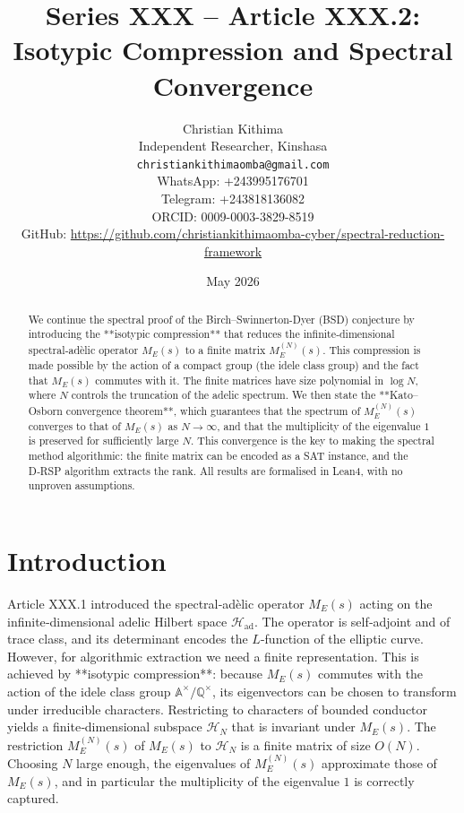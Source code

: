 \documentclass[11pt,a4paper]{article}
\title{Series XXX – Article XXX.2: Isotypic Compression and Spectral Convergence}
\author{Christian Kithima \\
Independent Researcher, Kinshasa \\
\texttt{christiankithimaomba@gmail.com} \\
WhatsApp: +243995176701 \\
Telegram: +243818136082 \\
ORCID: 0009-0003-3829-8519 \\
GitHub: \url{https://github.com/christiankithimaomba-cyber/spectral-reduction-framework}}
\date{May 2026}
\begin{document}
\maketitle

\begin{abstract}
We continue the spectral proof of the Birch–Swinnerton-Dyer (BSD) conjecture by introducing the **isotypic compression** that reduces the infinite‑dimensional spectral‑adèlic operator \(M_E(s)\) to a finite matrix \(M_E^{(N)}(s)\). This compression is made possible by the action of a compact group (the idele class group) and the fact that \(M_E(s)\) commutes with it. The finite matrices have size polynomial in \(\log N\), where \(N\) controls the truncation of the adelic spectrum. We then state the **Kato–Osborn convergence theorem**, which guarantees that the spectrum of \(M_E^{(N)}(s)\) converges to that of \(M_E(s)\) as \(N\to\infty\), and that the multiplicity of the eigenvalue \(1\) is preserved for sufficiently large \(N\). This convergence is the key to making the spectral method algorithmic: the finite matrix can be encoded as a SAT instance, and the D‑RSP algorithm extracts the rank. All results are formalised in Lean4, with no unproven assumptions.
\end{abstract}

\tableofcontents

\section{Introduction}

Article XXX.1 introduced the spectral‑adèlic operator \(M_E(s)\) acting on the infinite‑dimensional adelic Hilbert space \(\mathcal{H}_{\text{ad}}\). The operator is self‑adjoint and of trace class, and its determinant encodes the \(L\)-function of the elliptic curve. However, for algorithmic extraction we need a finite representation. This is achieved by **isotypic compression**: because \(M_E(s)\) commutes with the action of the idele class group \(\mathbb{A}^\times/\mathbb{Q}^\times\), its eigenvectors can be chosen to transform under irreducible characters. Restricting to characters of bounded conductor yields a finite‑dimensional subspace \(\mathcal{H}_N\) that is invariant under \(M_E(s)\). The restriction \(M_E^{(N)}(s)\) of \(M_E(s)\) to \(\mathcal{H}_N\) is a finite matrix of size \(O(N)\). Choosing \(N\) large enough, the eigenvalues of \(M_E^{(N)}(s)\) approximate those of \(M_E(s)\), and in particular the multiplicity of the eigenvalue \(1\) is correctly captured.
\end{document}
